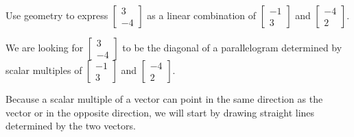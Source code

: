 \documentclass{ximera}
\begin{document}
\begin{example}\label{ex:lincombparallelogrammethod}
Use geometry to express $\begin{bmatrix}3\\-4\end{bmatrix}$ as a linear combination of $\begin{bmatrix}-1\\3\end{bmatrix}$ and $\begin{bmatrix}-4\\2\end{bmatrix}$.
\begin{explanation}
We are looking for $\begin{bmatrix}3\\-4\end{bmatrix}$ to be the diagonal of a parallelogram determined by scalar multiples of $\begin{bmatrix}-1\\3\end{bmatrix}$ and $\begin{bmatrix}-4\\2\end{bmatrix}$.  

\begin{image}
\end{image}

Because a scalar multiple of a vector can point in the same direction as the vector or in the opposite direction, we will start by drawing straight lines determined by the two vectors.


\end{explanation}
\end{example}
\end{document}
